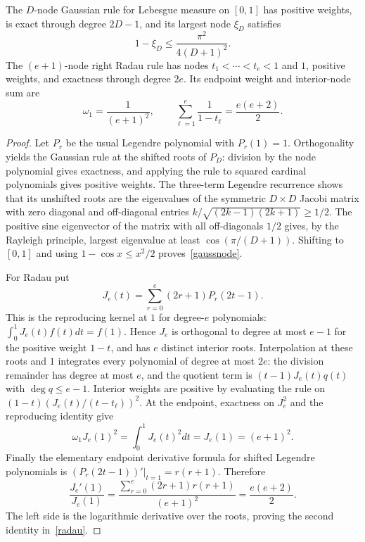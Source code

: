 \documentclass[11pt]{article}
\begin{document}
\begin{lemma}\label{quad}
The $D$-node Gaussian rule for Lebesgue measure on $[0,1]$ has positive
weights, is exact through degree $2D-1$, and its largest node $\xi_D$
satisfies
\begin{equation}\label{gaussnode}
 1-\xi_D\le\frac{\pi^2}{4(D+1)^2}.
\end{equation}
The $(e+1)$-node right Radau rule has nodes
$t_1<\cdots<t_e<1$ and $1$, positive weights, and exactness through
degree $2e$. Its endpoint weight and interior-node sum are
\begin{equation}\label{radau}
 \omega_1=\frac1{(e+1)^2},\qquad
 \sum_{\ell=1}^e\frac1{1-t_\ell}=\frac{e(e+2)}2.
\end{equation}
\end{lemma}
\begin{proof}
Let $P_r$ be the usual Legendre polynomial with $P_r(1)=1$.
Orthogonality yields the Gaussian rule at the shifted roots of $P_D$:
division by the node polynomial gives exactness, and applying the rule
to squared cardinal polynomials gives positive weights.
The three-term Legendre recurrence shows that its unshifted roots are
the eigenvalues of the symmetric $D\times D$ Jacobi matrix with zero
diagonal and off-diagonal entries
$k/\sqrt{(2k-1)(2k+1)}\ge1/2$. The positive sine eigenvector of the
matrix with all off-diagonals $1/2$ gives, by the Rayleigh principle,
largest eigenvalue at least $\cos(\pi/(D+1))$. Shifting to $[0,1]$
and using $1-\cos x\le x^2/2$ proves~\eqref{gaussnode}.

For Radau put
\[
 J_e(t)=\sum_{r=0}^e(2r+1)P_r(2t-1).
\]
This is the reproducing kernel at $1$ for degree-$e$ polynomials:
$\int_0^1J_e(t)f(t)dt=f(1)$. Hence $J_e$ is orthogonal to degree
at most $e-1$ for the positive weight $1-t$, and has $e$ distinct
interior roots. Interpolation at these roots and $1$ integrates every
polynomial of degree at most $2e$: the division remainder has degree
at most $e$, and the quotient term is $(t-1)J_e(t)q(t)$ with
$\deg q\le e-1$. Interior weights are positive by evaluating the
rule on
$(1-t)(J_e(t)/(t-t_\ell))^2$. At the endpoint, exactness on $J_e^2$
and the reproducing identity give
\[
 \omega_1 J_e(1)^2=\int_0^1J_e(t)^2dt=J_e(1)=(e+1)^2.
\]
Finally the elementary endpoint derivative formula for shifted Legendre
polynomials is $(P_r(2t-1))'|_{t=1}=r(r+1)$. Therefore
\[
 \frac{J_e'(1)}{J_e(1)}
 =\frac{\sum_{r=0}^e(2r+1)r(r+1)}{(e+1)^2}
 =\frac{e(e+2)}2.
\]
The left side is the logarithmic derivative over the roots, proving
the second identity in~\eqref{radau}.
\end{proof}
\end{document}
